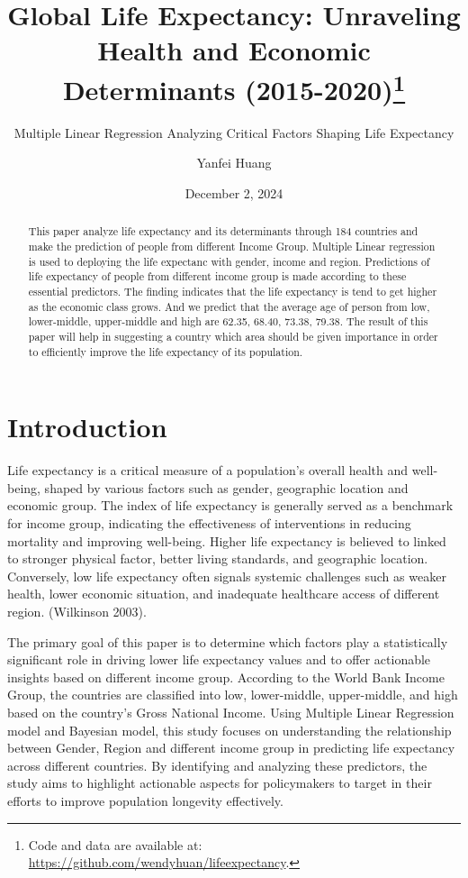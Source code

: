 \documentclass[
  letterpaper,
  DIV=11,
  numbers=noendperiod]{scrartcl}
\title{Global Life Expectancy: Unraveling Health and Economic
Determinants (2015-2020)\thanks{Code and data are available at:
\url{https://github.com/wendyhuan/lifeexpectancy}.}}
\subtitle{Multiple Linear Regression Analyzing Critical Factors Shaping
Life Expectancy}
\author{Yanfei Huang}
\date{December 2, 2024}
\renewcommand*\contentsname{Table of contents}
\newcommand\contentsname{Table of contents}
\begin{document}
\maketitle
\begin{abstract}
This paper analyze life expectancy and its determinants through 184
countries and make the prediction of people from different Income Group.
Multiple Linear regression is used to deploying the life expectanc with
gender, income and region. Predictions of life expectancy of people from
different income group is made according to these essential predictors.
The finding indicates that the life expectancy is tend to get higher as
the economic class grows. And we predict that the average age of person
from low, lower-middle, upper-middle and high are 62.35, 68.40, 73.38,
79.38. The result of this paper will help in suggesting a country which
area should be given importance in order to efficiently improve the life
expectancy of its population.
\end{abstract}

\renewcommand*\contentsname{Table of contents}
{
\hypersetup{linkcolor=}
\setcounter{tocdepth}{3}
\tableofcontents
}

\section{Introduction}\label{introduction}

Life expectancy is a critical measure of a population's overall health
and well-being, shaped by various factors such as gender, geographic
location and economic group. The index of life expectancy is generally
served as a benchmark for income group, indicating the effectiveness of
interventions in reducing mortality and improving well-being. Higher
life expectancy is believed to linked to stronger physical factor,
better living standards, and geographic location. Conversely, low life
expectancy often signals systemic challenges such as weaker health,
lower economic situation, and inadequate healthcare access of different
region. (Wilkinson 2003).

The primary goal of this paper is to determine which factors play a
statistically significant role in driving lower life expectancy values
and to offer actionable insights based on different income group.
According to the World Bank Income Group, the countries are classified
into low, lower-middle, upper-middle, and high based on the country's
Gross National Income. Using Multiple Linear Regression model and
Bayesian model, this study focuses on understanding the relationship
between Gender, Region and different income group in predicting life
expectancy across different countries. By identifying and analyzing
these predictors, the study aims to highlight actionable aspects for
policymakers to target in their efforts to improve population longevity
effectively.
\end{document}
